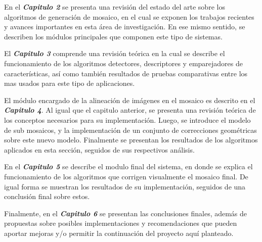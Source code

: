 En el \textit{\textbf{Capitulo 2}} se presenta una revisión del estado del arte sobre los algoritmos de generación de mosaico, en el cual se exponen los trabajos recientes y avances importantes en esta área de investigación. En ese mismo sentido, se describen los módulos principales que componen este tipo de sistemas.

El \textit{\textbf{Capitulo 3}} comprende una revisión teórica en la cual se describe el funcionamiento de los algoritmos detectores, descriptores y emparejadores de características, así como también resultados de pruebas comparativas entre los mas usados para este tipo de aplicaciones. 

El módulo encargado de la alineación de imágenes en el mosaico es descrito en el \textit{\textbf{Capitulo 4}}. Al igual que el capitulo anterior, se presenta una revisión teórica de los conceptos necesarios para su implementación. Luego, se introduce el modelo de sub mosaicos, y la implementación de un conjunto de correcciones geométricas sobre este nuevo modelo. Finalmente se presentan los resultados de los algoritmos aplicados en esta sección, seguidos de sus respectivos análisis.

En el \textit{\textbf{Capitulo 5}} se describe el modulo final del sistema, en donde se explica el funcionamiento de los algoritmos que corrigen visualmente el mosaico final. De igual forma se muestran los resultados de su implementación, seguidos de una conclusión final sobre estos.

Finalmente, en el \textit{\textbf{Capitulo 6}} se presentan las conclusiones finales, además de propuestas sobre posibles implementaciones y recomendaciones que pueden aportar mejoras y/o permitir la continuación del proyecto aquí planteado.